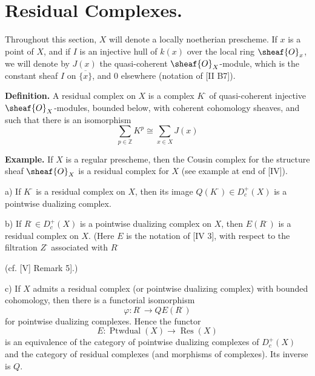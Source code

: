 \documentclass[12pt]{book}
\begin{document}
\setcounter{page}{304}
\section{Residual Complexes.}

Throughout this section, \(X\) will denote a locally noetherian prescheme. If \(x\) is a point of \(X\), and if \(I\) is an injective hull of \(k(x)\) over the local ring \(\sheaf{O}_{x}\), we will denote by \(J(x)\) the quasi-coherent \(\sheaf{O}_{X}\)-module, which is the constant sheaf \(I\) on \(\overline{\{x\}}\), and 0 elsewhere (notation of [II B7]).

\textbf{Definition.} A residual complex on \(X\) is a complex \(K^{\cdot}\) of quasi-coherent injective \(\sheaf{O}_{X}\)-modules, bounded below, with coherent cohomology sheaves, and such that there is an isomorphism
\[
\sum_{p \in \mathbb{Z}} K^{p} \cong \sum_{x \in X} J(x)
\]

\textbf{Example.} If \(X\) is a regular prescheme, then the Cousin complex for the structure sheaf \(\sheaf{O}_{X}\) is a residual complex for \(X\) (see example at end of [IV]).

\begin{proposition}
a) If \(K^{\cdot}\) is a residual complex on \(X\), then its image \(Q(K^{\cdot}) \in D_{c}^{+}(X)\) is a pointwise dualizing complex.

b) If \(R^{\cdot} \in D_{c}^{+}(X)\) is a pointwise dualizing complex on \(X\), then \(E(R^{\cdot})\) is a residual complex on \(X\). (Here \(E\) is the notation of [IV 3], with respect to the filtration \(Z^{\cdot}\) associated with \(R^{\cdot}\)

\setcounter{page}{305}
(cf. [V] Remark 5].)

c) If \(X\) admits a residual complex (or pointwise dualizing complex) with bounded cohomology, then there is a functorial isomorphism
\[
\varphi: R^{\cdot} \to QE\left(R^{\cdot}\right)
\]
for pointwise dualizing complexes. Hence the functor
\[
E: \operatorname{Ptwdual}(X) \to \operatorname{Res}(X)
\]
is an equivalence of the category of pointwise dualizing complexes of \(D_{c}^{+}(X)\) and the category of residual complexes (and morphisms of complexes). Its inverse is \(Q\).
\end{proposition}
\end{document}
